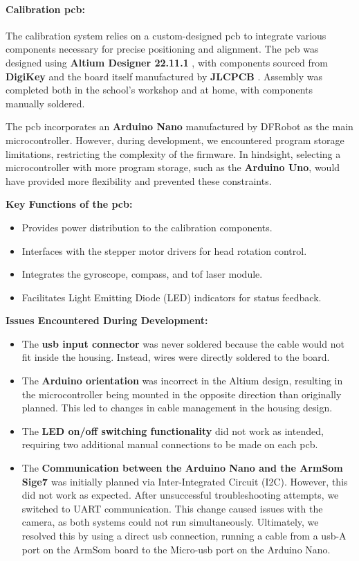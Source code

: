 \paragraph{Calibration \acrshort{pcb}:}
The calibration system relies on a custom-designed \acrshort{pcb} to integrate various components necessary for precise positioning and alignment. The \acrshort{pcb} was designed using \textbf{Altium Designer 22.11.1} \cite{altium_designer_22}, with components sourced from \textbf{DigiKey} \cite{digikey} and the board itself manufactured by \textbf{JLCPCB} \cite{jlcpcb}. Assembly was completed both in the school’s workshop and at home, with components manually soldered.

The \acrshort{pcb} incorporates an \textbf{Arduino Nano} manufactured by DFRobot \cite{arduino_nano_dfrobot} as the main microcontroller. However, during development, we encountered program storage limitations, restricting the complexity of the firmware. In hindsight, selecting a microcontroller with more program storage, such as the \textbf{Arduino Uno}, would have provided more flexibility and prevented these constraints.

\textbf{Key Functions of the \acrshort{pcb}:}
\begin{itemize}
	\item Provides power distribution to the calibration components.
	\item Interfaces with the stepper motor drivers for head rotation control.
	\item Integrates the gyroscope, compass, and \acrshort{tof} laser module.
	\item Facilitates Light Emitting Diode (LED) indicators for status feedback.
\end{itemize}

\textbf{Issues Encountered During Development:}
\begin{itemize}
	\item The \textbf{\acrshort{usb} input connector} was never soldered because the cable would not fit inside the housing. Instead, wires were directly soldered to the board.
	\item The \textbf{Arduino orientation} was incorrect in the Altium design, resulting in the microcontroller being mounted in the opposite direction than originally planned. This led to changes in cable management in the housing design.
	\item The \textbf{LED on/off switching functionality} did not work as intended, requiring two additional manual connections to be made on each \acrshort{pcb}.
	\item The \textbf{Communication between the Arduino Nano \cite{arduino_nano_dfrobot} and the ArmSom Sige7 \cite{armsom_sige7}} was initially planned via Inter-Integrated Circuit (I2C). However, this did not work as expected. After unsuccessful troubleshooting attempts, we switched to UART communication. This change caused issues with the camera, as both systems could not run simultaneously. Ultimately, we resolved this by using a direct \acrshort{usb} connection, running a cable from a \acrshort{usb}-A port on the ArmSom board to the Micro-\acrshort{usb} port on the Arduino Nano.
\end{itemize}

